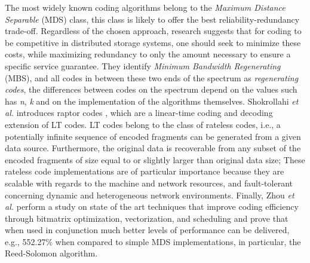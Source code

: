\documentclass[runningheads]{llncs}
\begin{document}
The most widely known coding algorithms belong to the \textit{Maximum Distance Separable} (MDS) class, this class is likely to offer the best reliability-redundancy trade-off. Regardless of the chosen approach, research \cite{network-coding-for-dss} suggests that for coding to be competitive in distributed storage systems, one should seek to minimize these costs, while maximizing redundancy to only the amount necessary to ensure a specific service guarantee. They identify \textit{Minimum Bandwidth Regenerating} (MBS), and all codes in between these two ends of the spectrum as \textit{regenerating codes}, the differences between codes on the spectrum depend on the values such has \textit{n}, \textit{k} and on the implementation of the algorithms themselves. Shokrollahi \textit{et al.} introduces raptor codes \cite{raptor-codes}, which are a linear-time coding and decoding extension of LT codes. LT codes belong to the class of rateless codes, i.e., a potentially infinite sequence of encoded fragments can be generated from a given data source. Furthermore, the original data is recoverable from any subset of the encoded fragments of size equal to or slightly larger than original data size; These rateless code implementations are of particular importance because they are scalable with regards to the machine and network resources,  and fault-tolerant concerning dynamic and heterogeneous network environments. Finally, Zhou \textit{et al.} \cite{fast_coding} perform a study on state of the art techniques that improve coding efficiency through bitmatrix optimization, vectorization, and scheduling and prove that when used in conjunction much better levels of performance can be delivered, e.g., 552.27\% when compared to simple MDS implementations, in particular, the Reed-Solomon algorithm.
\end{document}
